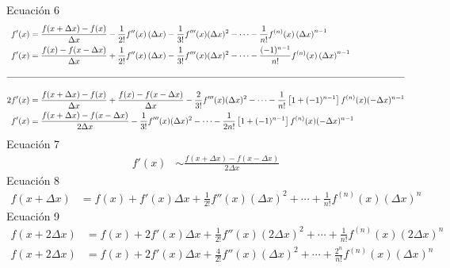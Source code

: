 \documentclass{article}
\begin{document}
\normalsize
Ecuación 6
\tiny
\begin{equation*}
    \begin{aligned}
        f'(x) & = \frac{f(x+\Delta x)-f(x)}{\Delta x} - \frac{1}{2!}f''(x)\left(\Delta x\right) - \frac{1}{3!}f'''(x)(\Delta x)^{2} - \cdots - \frac{1}{n!}f^{(n)}(x)\left(\Delta x\right)^{n-1}
        \\
        f'(x) & = \frac{f(x)-f(x-\Delta x)}{\Delta x} + \frac{1}{2!}f''(x)\left(\Delta x\right) - \frac{1}{3!}f'''(x)(\Delta x)^{2} - \cdots - \frac{(-1)^{n-1}}{n!}f^{(n)}(x)\left(\Delta x\right)^{n-1}
        \\\\\hline\\
        2f'(x) & = \frac{f(x+\Delta x)-f(x)}{\Delta x} + \frac{f(x)-f(x-\Delta x)}{\Delta x} - \frac{2}{3!}f'''(x)(\Delta x)^{2} - \cdots - \frac{1}{n!}\left[1+(-1)^{n-1}\right]f^{(n)}(x)(-\Delta x)^{n-1}
        \\
        f'(x) & = \frac{f(x+\Delta x)-f(x-\Delta x)}{2\Delta x}  - \frac{1}{3!}f'''(x)(\Delta x)^{2} - \cdots - \frac{1}{2n!}\left[1+(-1)^{n-1}\right]f^{(n)}(x)(-\Delta x)^{n-1}
    \end{aligned}
\end{equation*}
\normalsize
Ecuación 7
\begin{equation*}
    \begin{aligned}
        f'(x) & \sim \frac{f(x+\Delta x)-f(x-\Delta x)}{2\Delta x}
    \end{aligned}
\end{equation*}
Ecuación 8
\begin{equation*}
    \begin{aligned}
        f(x+\Delta x) & = f(x) + f'(x)\Delta x + \frac{1}{2!}f''(x)\left(\Delta x\right)^{2} + \cdots + \frac{1}{n!}f^{(n)}(x)\left(\Delta x\right)^{n}
    \end{aligned}
\end{equation*}
Ecuación 9
\begin{equation*}
    \begin{aligned}
        f(x+2\Delta x) & = f(x) + 2f'(x)\Delta x + \frac{1}{2!}f''(x)\left(2\Delta x\right)^{2} + \cdots + \frac{1}{n!}f^{(n)}(x)\left(2\Delta x\right)^{n}
        \\
        f(x+2\Delta x) & = f(x) + 2f'(x)\Delta x + \frac{4}{2!}f''(x)\left(\Delta x\right)^{2} + \cdots + \frac{2^{n}}{n!}f^{(n)}(x)\left(\Delta x\right)^{n}
    \end{aligned}
\end{equation*}
\end{document}
